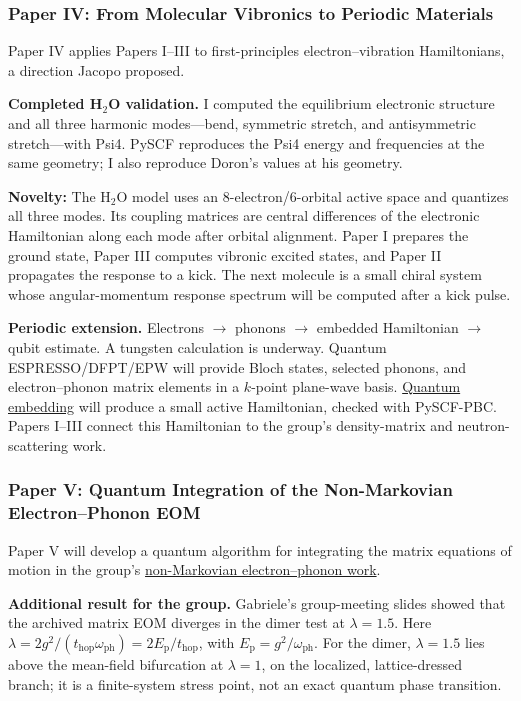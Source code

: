 \documentclass[11pt]{article}
\begin{document}
\subsubsection*{Paper IV: From Molecular Vibronics to Periodic Materials}
Paper IV applies Papers I--III to first-principles electron--vibration Hamiltonians, a direction Jacopo proposed.

\textbf{Completed H$_2$O validation.} I computed the equilibrium electronic structure and all three harmonic modes---bend, symmetric stretch, and antisymmetric stretch---with Psi4. PySCF reproduces the Psi4 energy and frequencies at the same geometry; I also reproduce Doron's values at his geometry.

\textbf{Novelty:} The H$_2$O model uses an 8-electron/6-orbital active space and quantizes all three modes. Its coupling matrices are central differences of the electronic Hamiltonian along each mode after orbital alignment. Paper I prepares the ground state, Paper III computes vibronic excited states, and Paper II propagates the response to a kick. The next molecule is a small chiral system whose angular-momentum response spectrum will be computed after a kick pulse.

\textbf{Periodic extension.} Electrons \(\rightarrow\) phonons \(\rightarrow\) embedded Hamiltonian \(\rightarrow\) qubit estimate. A tungsten calculation is underway. Quantum ESPRESSO/DFPT/EPW will provide Bloch states, selected phonons, and electron--phonon matrix elements in a \(k\)-point plane-wave basis. \href{https://doi.org/10.1038/s41524-020-00353-z}{Quantum embedding} will produce a small active Hamiltonian, checked with PySCF-PBC. Papers I--III connect this Hamiltonian to the group's density-matrix and neutron-scattering work.

\clearpage
\subsubsection*{Paper V: Quantum Integration of the Non-Markovian Electron--Phonon EOM}
Paper V will develop a quantum algorithm for integrating the matrix equations of motion in the group's \href{https://arxiv.org/abs/2606.22233}{non-Markovian electron--phonon work}.

\textbf{Additional result for the group.} Gabriele's group-meeting slides showed that the archived matrix EOM diverges in the dimer test at \(\lambda=1.5\). Here \(\lambda=2g^2/(t_{\mathrm{hop}}\omega_{\mathrm{ph}})=2E_{\mathrm p}/t_{\mathrm{hop}}\), with \(E_{\mathrm p}=g^2/\omega_{\mathrm{ph}}\). For the dimer, \(\lambda=1.5\) lies above the mean-field bifurcation at \(\lambda=1\), on the localized, lattice-dressed branch; it is a finite-system stress point, not an exact quantum phase transition.
\end{document}
